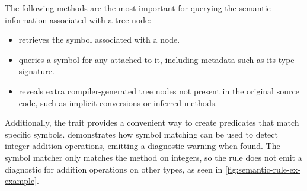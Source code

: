 \documentclass[../../main.tex]{subfiles}
\begin{document}
The following methods are the most important for querying the semantic information associated with a tree node:
\begin{itemize}
  \item {} retrieves the symbol associated with a node.
  \item {} queries a symbol for any  attached to it, including metadata such as its type signature.
  \item {} reveals extra compiler-generated tree nodes not present in the original source code, such as implicit conversions or inferred  methods.
\end{itemize}
%
Additionally, the  trait provides a convenient way to create predicates that match specific symbols.
 demonstrates how symbol matching can be used to detect integer addition operations, emitting a diagnostic warning when found.
The  symbol matcher only matches the \scala{+} method on integers, so the rule does not emit a diagnostic for addition operations on other types, as seen in \cref{fig:semantic-rule-ex-example}.

\end{document}

